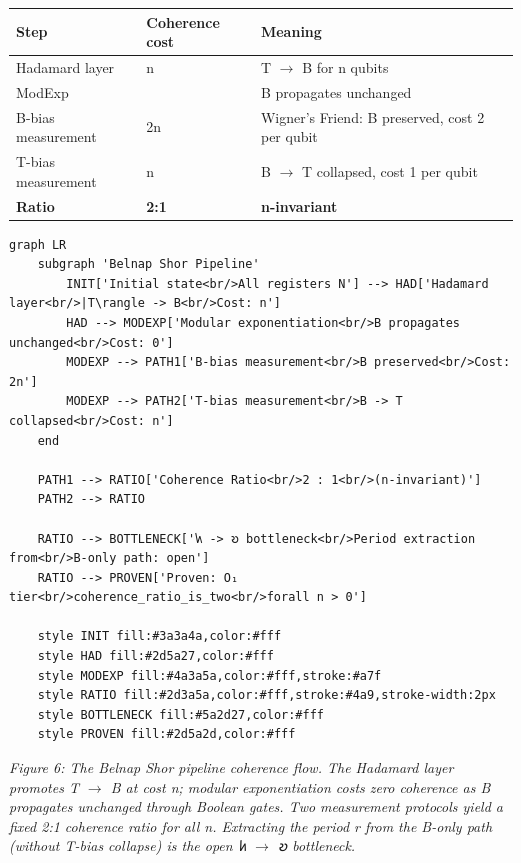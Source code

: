 \documentclass[12pt,a4paper]{article}
\begin{document}
\begin{table}[htbp]
\centering
\small
{}
\begin{tabularx}{\textwidth}{>{\centering\arraybackslash}X >{\centering\arraybackslash}X >{\centering\arraybackslash}X}
\toprule
\rowcolor{gray!25}\textbf{Step} & \textbf{Coherence cost} & \textbf{Meaning} \\
\midrule
\rowcolors{1}{white}{gray!10}
Hadamard layer & n & T $\rightarrow$ B for n qubits \\
ModExp & 0 & B propagates unchanged \\
B-bias measurement & 2n & Wigner's Friend: B preserved, cost 2 per qubit \\
T-bias measurement & n & B $\rightarrow$ T collapsed, cost 1 per qubit \\
\textbf{Ratio} & \textbf{2:1} & \textbf{n-invariant} \\
\bottomrule
\end{tabularx}
\end{table}

\begin{lstlisting}[language=mermaid]
graph LR
    subgraph 'Belnap Shor Pipeline'
        INIT['Initial state<br/>All registers N'] --> HAD['Hadamard layer<br/>|T\rangle -> B<br/>Cost: n']
        HAD --> MODEXP['Modular exponentiation<br/>B propagates unchanged<br/>Cost: 0']
        MODEXP --> PATH1['B-bias measurement<br/>B preserved<br/>Cost: 2n']
        MODEXP --> PATH2['T-bias measurement<br/>B -> T collapsed<br/>Cost: n']
    end

    PATH1 --> RATIO['Coherence Ratio<br/>2 : 1<br/>(n-invariant)']
    PATH2 --> RATIO

    RATIO --> BOTTLENECK['𐑿 -> 𐑹 bottleneck<br/>Period extraction from<br/>B-only path: open']
    RATIO --> PROVEN['Proven: O₁ tier<br/>coherence_ratio_is_two<br/>forall n > 0']

    style INIT fill:#3a3a4a,color:#fff
    style HAD fill:#2d5a27,color:#fff
    style MODEXP fill:#4a3a5a,color:#fff,stroke:#a7f
    style RATIO fill:#2d3a5a,color:#fff,stroke:#4a9,stroke-width:2px
    style BOTTLENECK fill:#5a2d27,color:#fff
    style PROVEN fill:#2d5a2d,color:#fff
\end{lstlisting}

\emph{Figure 6: The Belnap Shor pipeline coherence flow. The Hadamard layer promotes T $\rightarrow$ B at cost n; modular exponentiation costs zero coherence as B propagates unchanged through Boolean gates. Two measurement protocols yield a fixed 2:1 coherence ratio for all n. Extracting the period r from the B-only path (without T-bias collapse) is the open 𐑿 $\rightarrow$ 𐑹 bottleneck.}
\end{document}
